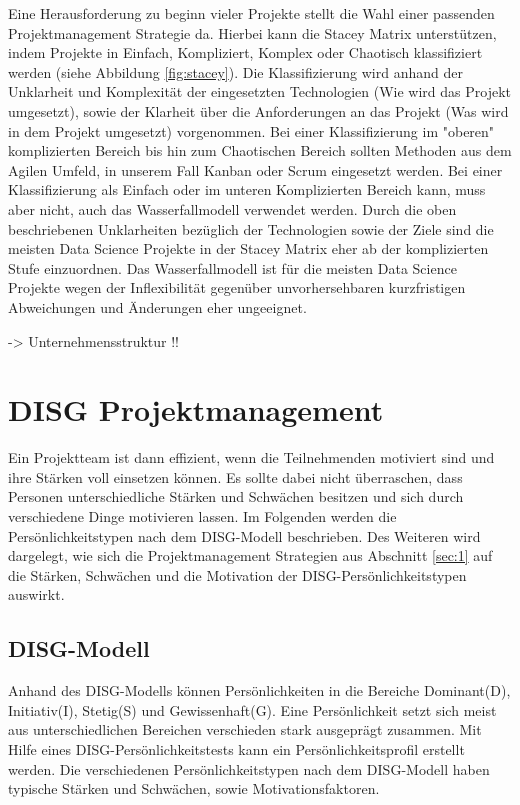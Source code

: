 \documentclass[twocolumn,10pt]{asme2ej}
\begin{document}
Eine Herausforderung zu beginn vieler Projekte stellt die Wahl einer passenden Projektmanagement Strategie da. Hierbei kann die Stacey Matrix \cite{Stacey2011StrategicMA} unterstützen, indem Projekte in Einfach, Kompliziert, Komplex oder Chaotisch klassifiziert werden (siehe Abbildung \ref{fig:stacey}). Die Klassifizierung wird anhand der Unklarheit und Komplexität der eingesetzten Technologien (Wie wird das Projekt umgesetzt), sowie der Klarheit über die Anforderungen an das Projekt (Was wird in dem Projekt umgesetzt) vorgenommen. Bei einer Klassifizierung im "oberen" komplizierten Bereich bis hin zum Chaotischen Bereich sollten Methoden aus dem Agilen Umfeld, in unserem Fall Kanban oder Scrum eingesetzt werden. Bei einer Klassifizierung als Einfach oder im unteren Komplizierten Bereich kann, muss aber nicht, auch das Wasserfallmodell verwendet werden. Durch die oben beschriebenen Unklarheiten bezüglich der Technologien sowie der Ziele sind die meisten Data Science Projekte in der Stacey Matrix eher ab der komplizierten Stufe einzuordnen. Das Wasserfallmodell ist für die meisten Data Science Projekte wegen der Inflexibilität gegenüber unvorhersehbaren kurzfristigen Abweichungen und Änderungen  eher ungeeignet.

-> Unternehmensstruktur !!

\section{DISG Projektmanagement}\label{sec:2}
Ein Projektteam ist dann effizient, wenn die Teilnehmenden motiviert sind und ihre Stärken voll einsetzen können. Es sollte dabei nicht überraschen, dass Personen unterschiedliche Stärken und Schwächen besitzen und sich durch verschiedene Dinge motivieren lassen. Im Folgenden werden die Persönlichkeitstypen nach dem DISG-Modell beschrieben. Des Weiteren wird dargelegt, wie sich die Projektmanagement Strategien aus Abschnitt \ref{sec:1} auf die Stärken, Schwächen und die Motivation der DISG-Persönlichkeitstypen auswirkt. 

\subsection{DISG-Modell}
Anhand des DISG-Modells \cite{disc} können Persönlichkeiten in die Bereiche Dominant(D), Initiativ(I), Stetig(S) und Gewissenhaft(G). Eine Persönlichkeit setzt sich meist aus unterschiedlichen Bereichen verschieden stark ausgeprägt zusammen. Mit Hilfe eines DISG-Persönlichkeitstests kann ein Persönlichkeitsprofil erstellt werden. Die verschiedenen Persönlichkeitstypen nach dem DISG-Modell haben typische Stärken und Schwächen, sowie Motivationsfaktoren. 
\end{document}
